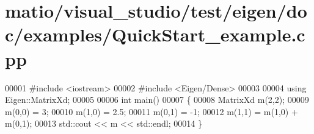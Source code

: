 \hypertarget{matio_2visual__studio_2test_2eigen_2doc_2examples_2_quick_start__example_8cpp_source}{}\section{matio/visual\+\_\+studio/test/eigen/doc/examples/\+Quick\+Start\+\_\+example.cpp}
\label{matio_2visual__studio_2test_2eigen_2doc_2examples_2_quick_start__example_8cpp_source}

\begin{DoxyCode}
00001 \textcolor{preprocessor}{#include <iostream>}
00002 \textcolor{preprocessor}{#include <Eigen/Dense>}
00003 
00004 \textcolor{keyword}{using} Eigen::MatrixXd;
00005 
00006 \textcolor{keywordtype}{int} main()
00007 \{
00008   MatrixXd m(2,2);
00009   m(0,0) = 3;
00010   m(1,0) = 2.5;
00011   m(0,1) = -1;
00012   m(1,1) = m(1,0) + m(0,1);
00013   std::cout << m << std::endl;
00014 \}
\end{DoxyCode}

